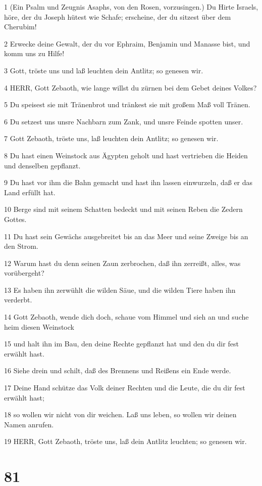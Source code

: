 \par 1 (Ein Psalm und Zeugnis Asaphs, von den Rosen, vorzusingen.) Du Hirte Israels, höre, der du Joseph hütest wie Schafe; erscheine, der du sitzest über dem Cherubim!
\par 2 Erwecke deine Gewalt, der du vor Ephraim, Benjamin und Manasse bist, und komm uns zu Hilfe!
\par 3 Gott, tröste uns und laß leuchten dein Antlitz; so genesen wir.
\par 4 HERR, Gott Zebaoth, wie lange willst du zürnen bei dem Gebet deines Volkes?
\par 5 Du speisest sie mit Tränenbrot und tränkest sie mit großem Maß voll Tränen.
\par 6 Du setzest uns unsre Nachbarn zum Zank, und unsre Feinde spotten unser.
\par 7 Gott Zebaoth, tröste uns, laß leuchten dein Antlitz; so genesen wir.
\par 8 Du hast einen Weinstock aus Ägypten geholt und hast vertrieben die Heiden und denselben gepflanzt.
\par 9 Du hast vor ihm die Bahn gemacht und hast ihn lassen einwurzeln, daß er das Land erfüllt hat.
\par 10 Berge sind mit seinem Schatten bedeckt und mit seinen Reben die Zedern Gottes.
\par 11 Du hast sein Gewächs ausgebreitet bis an das Meer und seine Zweige bis an den Strom.
\par 12 Warum hast du denn seinen Zaun zerbrochen, daß ihn zerreißt, alles, was vorübergeht?
\par 13 Es haben ihn zerwühlt die wilden Säue, und die wilden Tiere haben ihn verderbt.
\par 14 Gott Zebaoth, wende dich doch, schaue vom Himmel und sieh an und suche heim diesen Weinstock
\par 15 und halt ihn im Bau, den deine Rechte gepflanzt hat und den du dir fest erwählt hast.
\par 16 Siehe drein und schilt, daß des Brennens und Reißens ein Ende werde.
\par 17 Deine Hand schütze das Volk deiner Rechten und die Leute, die du dir fest erwählt hast;
\par 18 so wollen wir nicht von dir weichen. Laß uns leben, so wollen wir deinen Namen anrufen.
\par 19 HERR, Gott Zebaoth, tröste uns, laß dein Antlitz leuchten; so genesen wir.

\chapter{81}

